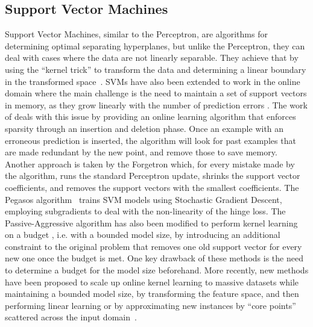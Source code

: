 \subsection*{Support Vector Machines}
Support Vector Machines, similar to the Perceptron, are algorithms for determining
optimal separating hyperplanes, but unlike the Perceptron, they can deal with
cases where the data are not linearly separable. They achieve that by using the
``kernel trick'' to transform the data and determining a linear boundary in
the transformed space~\cite{esl}.
SVMs have also
been extended to work in the online domain \cite{online-kernels}
where the main challenge is the need to maintain a set of support vectors
in memory, as they grow linearly with the number of prediction errors
\cite{budget-classification}. The work of \citet{budget-classification}
deals with this issue by providing an online learning algorithm
that enforces sparsity through an insertion and deletion phase.
Once an example with an erroneous prediction is inserted, the algorithm will look
for past examples that are made redundant by the new point,
and remove those to save memory.
Another approach is taken by the Forgetron \cite{forgetron} which,
for every mistake made by the algorithm, runs the standard
Perceptron update, shrinks the support vector coefficients, and removes
the support vectors with the smallest coefficients.
The Pegasos algorithm~\cite{pegasos} trains SVM models using Stochastic Gradient Descent,
employing subgradients to deal with the non-linearity of the hinge
loss.
The Passive-Aggressive algorithm has also been modified
to perform kernel learning on a budget \cite{pa-budget},
i.e. with a bounded model size, by introducing an additional
constraint to the original problem that removes one old support
vector for every new one once the budget is met.
One key drawback of these methods
is the need to determine a budget for the model size beforehand.
More recently, new methods have been proposed to scale up
online kernel learning to massive datasets while maintaining a bounded model size,
by transforming the feature space, and then performing linear learning \cite{large-online-kernels}
or by approximating new instances by ``core points''
scattered across the input domain~\cite{approximation-vm}.

